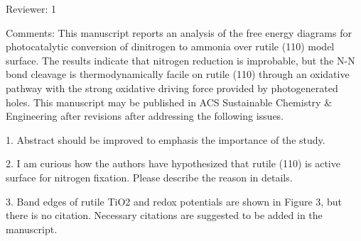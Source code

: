 Reviewer: 1

Comments:
This manuscript reports an analysis of the free energy diagrams for photocatalytic conversion of dinitrogen to ammonia over rutile (110) model surface. The results indicate that nitrogen reduction is improbable, but the N-N bond cleavage is thermodynamically facile on rutile (110) through an oxidative pathway with the strong oxidative driving force provided by photogenerated holes. This manuscript may be published in ACS Sustainable Chemistry & Engineering after revisions after addressing the following issues.


1. Abstract should be improved to emphasis the importance of the study.


2. I am curious how the authors have hypothesized that rutile (110) is active surface for nitrogen fixation. Please describe the reason in details.



3. Band edges of rutile TiO2 and redox potentials are shown in Figure 3, but there is no citation. Necessary citations are suggested to be added in the manuscript.


